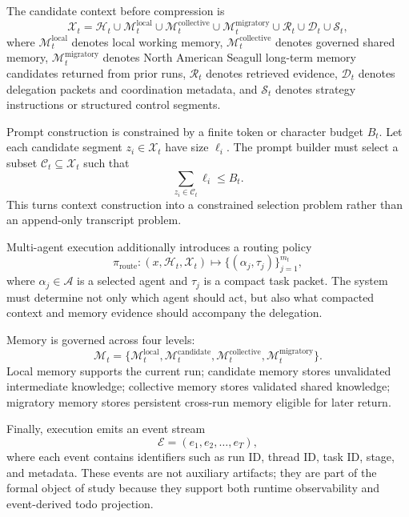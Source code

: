 \documentclass[a4paper,fleqn]{cas-sc}
\begin{document}
The candidate context before compression is
\begin{equation}
\mathcal{X}_t = \mathcal{H}_t \cup \mathcal{M}^{\text{local}}_t \cup \mathcal{M}^{\text{collective}}_t \cup \mathcal{M}^{\text{migratory}}_t \cup \mathcal{R}_t \cup \mathcal{D}_t \cup \mathcal{S}_t,
\end{equation}
where $\mathcal{M}^{\text{local}}_t$ denotes local working memory, $\mathcal{M}^{\text{collective}}_t$ denotes governed shared memory, $\mathcal{M}^{\text{migratory}}_t$ denotes North American Seagull long-term memory candidates returned from prior runs, $\mathcal{R}_t$ denotes retrieved evidence, $\mathcal{D}_t$ denotes delegation packets and coordination metadata, and $\mathcal{S}_t$ denotes strategy instructions or structured control segments.

Prompt construction is constrained by a finite token or character budget $B_t$. Let each candidate segment $z_i \in \mathcal{X}_t$ have size $\ell_i$. The prompt builder must select a subset $\mathcal{C}_t \subseteq \mathcal{X}_t$ such that
\begin{equation}
\sum_{z_i \in \mathcal{C}_t} \ell_i \leq B_t.
\end{equation}
This turns context construction into a constrained selection problem rather than an append-only transcript problem.

Multi-agent execution additionally introduces a routing policy
\begin{equation}
\pi_{\text{route}} : (x, \mathcal{H}_t, \mathcal{X}_t) \mapsto \{(\alpha_j, \tau_j)\}_{j=1}^{m_t},
\end{equation}
where $\alpha_j \in \mathcal{A}$ is a selected agent and $\tau_j$ is a compact task packet. The system must determine not only which agent should act, but also what compacted context and memory evidence should accompany the delegation.

Memory is governed across four levels:
\begin{equation}
\mathcal{M}_t = \{\mathcal{M}^{\text{local}}_t, \mathcal{M}^{\text{candidate}}_t, \mathcal{M}^{\text{collective}}_t, \mathcal{M}^{\text{migratory}}_t\}.
\end{equation}
Local memory supports the current run; candidate memory stores unvalidated intermediate knowledge; collective memory stores validated shared knowledge; migratory memory stores persistent cross-run memory eligible for later return.

Finally, execution emits an event stream
\begin{equation}
\mathcal{E} = (e_1, e_2, \ldots, e_T),
\end{equation}
where each event contains identifiers such as run ID, thread ID, task ID, stage, and metadata. These events are not auxiliary artifacts; they are part of the formal object of study because they support both runtime observability and event-derived todo projection.
\end{document}
